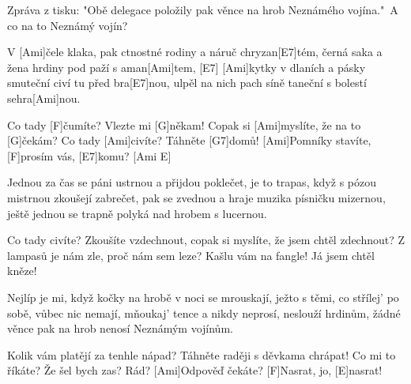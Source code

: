 
\rec
Zpráva z tisku: "Obě delegace položily pak věnce na hrob Neznámého vojína."\ A co na to Neznámý vojín?

\sloka
V [Ami]čele klaka, pak ctnostné rodiny a náruč chryzan[E7]tém,
černá saka a žena hrdiny pod paží s aman[Ami]tem, [E7]
[Ami]kytky v dlaních a pásky smuteční civí tu před bra[E7]nou,
ulpěl na nich pach síně taneční s bolestí sehra[Ami]nou.

Co tady [F]čumíte? Vlezte mi [G]někam!
Copak si [Ami]myslíte, že na to [G]čekám?
Co tady [Ami]civíte? Táhněte [G7]domů!
[Ami]Pomníky stavíte, [F]prosím vás, [E7]komu? [Ami E]

\sloka
Jednou za čas se páni ustrnou a přijdou poklečet,
je to trapas, když s pózou mistrnou zkoušejí zabrečet,
pak se zvednou a hraje muzika písničku mizernou,
ještě jednou se trapně polyká nad hrobem s lucernou.

Co tady civíte? Zkoušíte vzdechnout,
copak si myslíte, že jsem chtěl zdechnout?
Z lampasů je nám zle, proč nám sem leze? 
Kašlu vám na fangle! Já jsem chtěl kněze!

\sloka
Nejlíp je mi, když kočky na hrobě v noci se mrouskají,
ježto s těmi, co střílej’ po sobě, vůbec nic nemají,
mňoukaj’ tence a nikdy neprosí, neslouží hrdinům,
žádné věnce pak na hrob nenosí Neznámým vojínům.

Kolik vám platějí za tenhle nápad?
Táhněte raději s děvkama chrápat!
Co mi to říkáte? Že šel bych zas? Rád?
[Ami]Odpověď čekáte? [F]Nasrat, jo, [E]nasrat!
